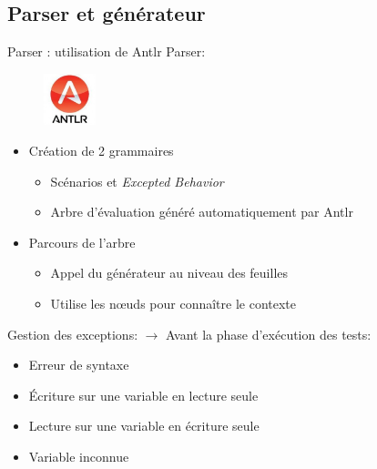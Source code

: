 \documentclass{beamer}
\begin{document}
\subsection{Parser et g\'en\'erateur}
\begin{frame}{Parser : utilisation de Antlr}
	Parser: 
\begin{figure}
	\includegraphics[width=1.5cm]{antlr.jpg}
\end{figure}
	\vspace{-20px}
	\begin{itemize}
		\item Création de 2 grammaires 
			\begin{itemize}
				\item Scénarios et \textit{Excepted Behavior}
				\item Arbre d'évaluation généré automatiquement par Antlr
			\end{itemize}
			\footnotesize
			\normalsize
			\pause
		\item Parcours de l'arbre
			\begin{itemize}
				\item Appel du générateur au niveau des feuilles
				\item Utilise les n\oe{}uds pour connaître le contexte  
			\end{itemize}
	\end{itemize}
	\vfill
	\pause
	Gestion des exceptions:\newline
	\hspace{20px}
	$\rightarrow$ Avant la phase d'exécution des tests: 
			\begin{itemize}
					\vspace{-10px}
		\item Erreur de syntaxe
		\item Écriture sur une variable en lecture seule
		\item Lecture sur une variable en écriture seule
		\item Variable inconnue 
		\end{itemize}
\end{frame}
\end{document}
